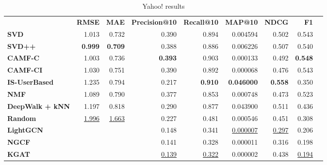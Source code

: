 \begin{table}[!htp]\centering
\caption{Yahoo! results}\label{tab:yahootable}
\scriptsize
\begin{tabular}{lrrrrrrrr}\toprule
&\textbf{RMSE} &\textbf{MAE} &\textbf{Precision@10} &\textbf{Recall@10} &\textbf{MAP@10} &\textbf{NDCG} &\textbf{F1} \\\cmidrule{2-8}
\textbf{SVD} &1.013 &0.732 &0.390 &0.894 &0.004594 &0.502 &0.543 \\\cmidrule{1-8}
\textbf{SVD++} &\textbf{0.999} &\textbf{0.709} &0.388 &0.886 &0.006226 &0.507 &0.540 \\\cmidrule{1-8}
\textbf{CAMF-C} &1.003 &0.736 &\textbf{0.393} &0.903 &0.000133 &0.492 &\textbf{0.548} \\\cmidrule{1-8}
\textbf{CAMF-CI} &1.030 &0.751 &0.390 &0.892 &0.000068 &0.476 &0.543 \\\cmidrule{1-8}
\textbf{IS-UserBased} &1.235 &0.794 &0.217 &\textbf{0.910} &\textbf{0.046000} &\textbf{0.558} &0.350 \\\cmidrule{1-8}
\textbf{NMF} &1.089 &0.790 &0.377 &0.853 &0.000748 &0.473 &0.523 \\\cmidrule{1-8}
\textbf{DeepWalk + kNN} &1.197 &0.818 &0.290 &0.877 &0.043900 &0.511 &0.436 \\\cmidrule{1-8}
\textbf{Random} &\ul{1.996} &\ul{1.663} &0.227 &0.481 &0.000546 &0.451 &0.308 \\\cmidrule{1-8}
\textbf{LightGCN} & & &0.148 &0.341 &\ul{0.000007} &\ul{0.297} &0.206 \\\cmidrule{1-1}\cmidrule{1-8}
\textbf{NGCF} & & &0.141 &0.328 &0.000011 &0.316 &0.198 \\\midrule
\textbf{KGAT} & & &\ul{0.139} &\ul{0.322} &0.000002 &0.438 &\ul{0.194} \\
\bottomrule
\end{tabular}
\end{table}

